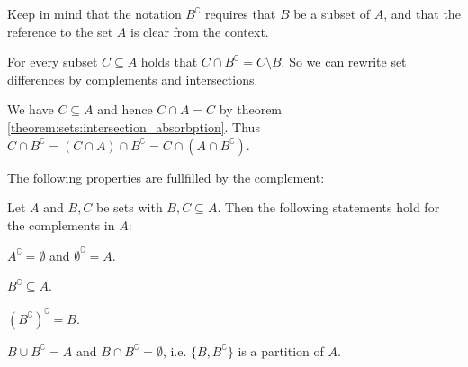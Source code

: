 \begin{remarks}
    \begin{remarkenumerate}
        \item Keep in mind that the notation $B^\complement$ requires that $B$ be a subset of $A$, and that the reference to the set $A$ is clear from the context.
        \item For every subset $C\subseteq A$ holds that $C\cap B^\complement=C\setminus B$. So we can rewrite set differences by complements and intersections.
        \begin{miniproof}
            We have $C\subseteq A$ and hence $C\cap A=C$ by theorem \ref{theorem:sets:intersection_absorbption}. Thus $C\cap B^\complement=(C\cap A)\cap B^\complement=C\cap (A\cap B^\complement)$.
        \end{miniproof}
    \end{remarkenumerate}
\end{remarks}

The following properties are fullfilled by the complement:

\begin{theorem}
    Let $A$ and $B,C$ be sets with $B,C\subseteq A$. Then the following statements hold for the complements in $A$:
    \begin{intheoremenumerate}
        \item $A^\complement=\emptyset$ and $\emptyset^\complement=A$.
        \item $B^\complement\subseteq A$.
        \item\label{theorem:sets:double_complement} $(B^\complement)^\complement=B$.
        \item $B\cup B^\complement=A$ and $B\cap B^\complement=\emptyset$, i.e. $\{B,B^\complement\}$ is a partition of $A$.
    \end{intheoremenumerate}
\end{theorem}

